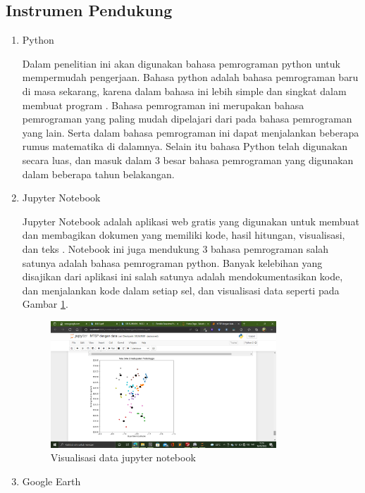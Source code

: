 \subsection{Instrumen Pendukung}
\begin{enumerate}
    \item Python
    
    Dalam penelitian ini akan digunakan bahasa pemrograman python untuk mempermudah pengerjaan. Bahasa python adalah bahasa pemrograman baru di masa sekarang, karena dalam bahasa ini lebih simple dan singkat dalam membuat program \cite{syahrudin2018input}. Bahasa pemrograman ini merupakan bahasa pemrograman yang paling mudah dipelajari dari pada bahasa pemrograman yang lain. Serta dalam bahasa pemrograman ini dapat menjalankan beberapa rumus matematika di dalamnya. Selain itu bahasa Python telah digunakan secara luas, dan masuk dalam 3 besar bahasa pemrograman yang digunakan dalam beberapa tahun belakangan.
    
    \item Jupyter Notebook
    
    Jupyter Notebook adalah aplikasi web gratis yang digunakan untuk membuat dan membagikan dokumen yang memiliki kode, hasil hitungan, visualisasi, dan teks \cite{Kluyver2016jupyter}. Notebook ini juga mendukung 3 bahasa pemrograman salah satunya adalah bahasa pemrograman python. Banyak kelebihan yang disajikan dari aplikasi ini salah satunya adalah mendokumentasikan kode, dan menjalankan kode dalam setiap sel, dan visualisasi data seperti pada Gambar \ref{fig:visjupyter}.

\begin{figure}[h!]
  \centering
  \includegraphics[width=0.8\textwidth]{visualisasi jupyter.png}
  \caption{Visualisasi data jupyter notebook}
  \label{fig:visjupyter}
\end{figure}

	\item Google Earth
	

\end{enumerate}
